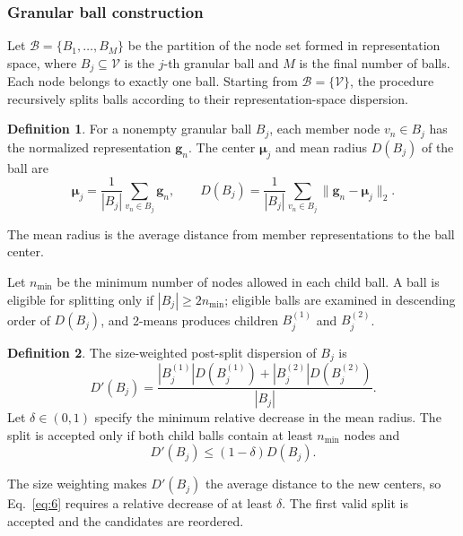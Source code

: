 \documentclass[times,review,10pt]{elsarticle}
\theoremstyle{definition}
\newtheorem{definition}{Definition}
\theoremstyle{plain}
\begin{document}
\subsubsection{Granular ball construction}\label{sec:3.2.2}

Let \(\mathcal B=\{B_1,\ldots,B_M\}\) be the partition of the node set formed in representation space, where \(B_j\subseteq\mathcal V\) is the \(j\)-th granular ball and \(M\) is the final number of balls. Each node belongs to exactly one ball. Starting from \(\mathcal B=\{\mathcal V\}\), the procedure recursively splits balls according to their representation-space dispersion.

\begin{definition}
For a nonempty granular ball \(B_j\), each member node \(v_n\in B_j\) has the normalized representation \(\mathbf g_n\). The center \(\boldsymbol\mu_j\) and mean radius \(D(B_j)\) of the ball are
\begin{equation}\label{eq:4}
\boldsymbol\mu_j=\frac{1}{|B_j|}\sum_{v_n\in B_j}\mathbf g_n,
\qquad D(B_j)=\frac{1}{|B_j|}\sum_{v_n\in B_j}\|\mathbf g_n-\boldsymbol\mu_j\|_2.
\end{equation}
\end{definition}

The mean radius is the average distance from member representations to the ball center.


Let \(n_{\min}\) be the minimum number of nodes allowed in each child ball. A ball is eligible for splitting only if \(|B_j|\geq2n_{\min}\); eligible balls are examined in descending order of \(D(B_j)\), and 2-means produces children \(B_j^{(1)}\) and \(B_j^{(2)}\).

\begin{definition}
The size-weighted post-split dispersion of \(B_j\) is
\begin{equation}\label{eq:5}
D'(B_j) = \frac{|B_j^{(1)}|D(B_j^{(1)}) + |B_j^{(2)}|D(B_j^{(2)})}{|B_j|}.
\end{equation}
Let \(\delta \in (0,1)\) specify the minimum relative decrease in the mean radius. The split is accepted only if both child balls contain at least \(n_{\min}\) nodes and
\begin{equation}\label{eq:6}
D'(B_j) \leq (1 - \delta)D(B_j).
\end{equation}
\end{definition}

The size weighting makes \(D'(B_j)\) the average distance to the new centers, so Eq.~\eqref{eq:6} requires a relative decrease of at least \(\delta\). The first valid split is accepted and the candidates are reordered.
\end{document}
